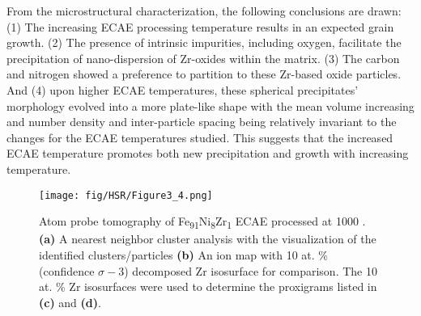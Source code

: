 		From the microstructural characterization, the following conclusions are drawn: (1) The increasing ECAE processing temperature results in an expected grain growth. (2) The presence of intrinsic impurities, including oxygen, facilitate the precipitation of nano-dispersion of Zr-oxides within the matrix. (3) The carbon and nitrogen showed a preference to partition to these Zr-based oxide particles. And (4) upon higher ECAE temperatures, these spherical precipitates’ morphology evolved into a more plate-like shape with the mean volume increasing and number density and inter-particle spacing being relatively invariant to the changes for the ECAE temperatures studied. This suggests that the increased ECAE temperature promotes both new precipitation and growth with increasing temperature.    
		
		\begin{figure}
			\centering
			\texttt{[image: fig/HSR/Figure3\_4.png]}
			\caption[Atom probe tomography of Fe\textsubscript{91}Ni\textsubscript{8}Zr\textsubscript{1 } ECAE processed at 1000 \celsius{}.]{Atom probe tomography of Fe\textsubscript{91}Ni\textsubscript{8}Zr\textsubscript{1 } ECAE processed at 1000 \celsius{}. \textbf{(a)} A nearest neighbor cluster analysis with the visualization of the identified clusters/particles \textbf{(b)} An ion map with
				10 at. \% (confidence $\sigma-3${}) decomposed Zr isosurface for comparison. The 10 at. \% Zr isosurfaces were used to determine the proxigrams listed in \textbf{(c)} and \textbf{(d)}.}
			\label{fig:HSR3}
		\end{figure}

